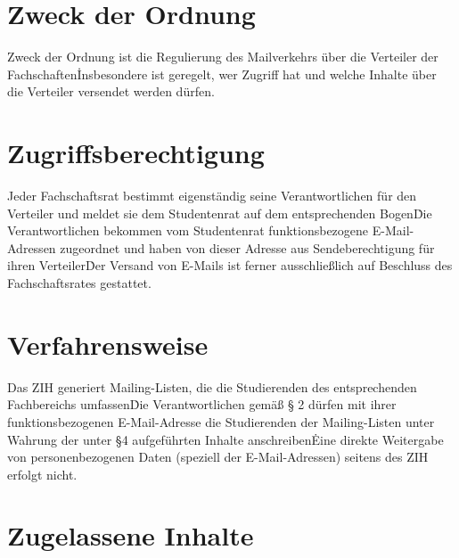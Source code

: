 \setcounter{section}{0}
\begin{multicols}{2}


\section{Zweck der Ordnung}

\Abs \Satz Zweck der Ordnung ist die Regulierung des Mailverkehrs über die Verteiler der Fachschaften\. Insbesondere ist geregelt, wer Zugriff hat und welche Inhalte über die Verteiler versendet werden dürfen.


\section{Zugriffsberechtigung}

\Abs \Satz Jeder Fachschaftsrat bestimmt eigenständig seine Verantwortlichen für den Verteiler und meldet sie dem Studentenrat auf dem entsprechenden Bogen\. Die Verantwortlichen bekommen vom Studentenrat funktionsbezogene E-Mail-Adressen zugeordnet und haben von dieser Adresse aus Sendeberechtigung für ihren Verteiler\. Der Versand von E-Mails ist ferner ausschließlich auf Beschluss des Fachschaftsrates gestattet.


\section{Verfahrensweise}

\Abs \Satz Das ZIH generiert Mailing-Listen, die die Studierenden des entsprechenden Fachbereichs umfassen\. Die Verantwortlichen gemäß § 2 dürfen mit ihrer funktionsbezogenen E-Mail-Adresse die Studierenden der Mailing-Listen unter Wahrung der unter §4 aufgeführten Inhalte anschreiben\. Eine direkte Weitergabe von personenbezogenen Daten (speziell der E-Mail-Adressen) seitens des ZIH erfolgt nicht.

\section{Zugelassene Inhalte}


\end{multicols}
